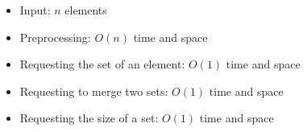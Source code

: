 \begin{itemize}
	\item Input: $n$ elements
	\item Preprocessing: $O(n)$ time and space
	\item Requesting the set of an element: $O(1)$ time and space
	\item Requesting to merge two sets: $O(1)$ time and space
	\item Requesting the size of a set: $O(1)$ time and space
\end{itemize}